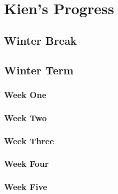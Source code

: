 \documentclass[onecolumn, draftclsnofoot,10pt, compsoc]{IEEEtran}
\begin{document}
\section{Kien's Progress} \label{kien_weekly_summ}
\begin{singlespace}
\subsection{Winter Break} \label{k_winter}

\subsection{Winter Term} \label{k_wterm}

\subsubsection{Week One} \label{k_w1}

\subsubsection{Week Two} \label{k_w2}

\subsubsection{Week Three} \label{k_w3}

\subsubsection{Week Four} \label{k_w4}
\label{k_regression}

\subsubsection{Week Five} \label{k_w5}


\end{singlespace}
%
\end{document}

